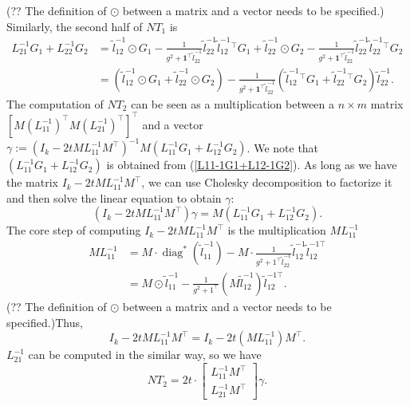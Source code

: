 \documentclass[final,onefignum,onetabnum]{siamart190516}
\begin{document}
(?? The definition of $\odot$ between a matrix and a vector needs to be specified.) Similarly, the second half of $NT_1$ is
\begin{equation}
    \begin{aligned}
            L^{-1}_{21} G_1 + L^{-1}_{22} G_2 &= \widetilde{l}^{-1}_{12} \odot G_1 - \frac{1}{g^2+\mathbf{1}^\top \widetilde{l}^{-1}_{22}}\widetilde{l}^{-1}_{22}\widetilde{l}^{-1}_{12}^\top G_1 + 
            \widetilde{l}^{-1}_{22} \odot G_2 - \frac{1}{g^2+\mathbf{1}^\top \widetilde{l}^{-1}_{22}}\widetilde{l}^{-1}_{22}\widetilde{l}^{-1}_{22}^\top G_2\\
            & = \left(\widetilde{l}^{-1}_{12} \odot G_1 +\widetilde{l}^{-1}_{22} \odot G_2 \right) - \frac{1}{g^2+\mathbf{1}^\top \widetilde{l}^{-1}_{22}}\left(\widetilde{l}^{-1}_{12}^\top G_1 + \widetilde{l}^{-1}_{22}^\top G_2\right)\widetilde{l}^{-1}_{22}.
    \end{aligned}
\end{equation}
The computation of $NT_2$ can be seen as a multiplication between a $n\times m$ matrix $[M(L_{11}^{-1})^{\top} M(L_{21}^{-1})^{\top}]^{\top}$ and a vector $\gamma := \left(I_k-2t M L^{-1}_{11} M^\top\right)^{-1}M\left(L^{-1}_{11} G_1 + L^{-1}_{12} G_2\right)$. We note that $\left(L^{-1}_{11} G_1 + L^{-1}_{12} G_2\right)$ is obtained from (\ref{L11-1G1+L12-1G2}). As long as we have the matrix $I_k-2t M L^{-1}_{11} M^\top$, we can use Cholesky decomposition to factorize it and then solve the linear equation to obtain $\gamma$:
\begin{equation}
    \left(I_k-2t M L^{-1}_{11} M^\top\right)\gamma = M\left(L^{-1}_{11} G_1 + L^{-1}_{12} G_2\right).
\end{equation}
The core step of computing $I_k-2t M L^{-1}_{11} M^\top$ is the multiplication $M L^{-1}_{11}$
\begin{equation}
    \begin{aligned}
             M L^{-1}_{11} &= M\cdot \operatorname{diag}^{*}\left(\widetilde{l}_{11}^{-1}\right)-M\cdot\frac{1}{g^{2}+1^{\top} \widetilde{l}_{22}^{-1}} \widetilde{l}_{12}^{-1} \widetilde{l}_{12}^{-1 \top}   \\
    &= M\odot \widetilde{l}_{11}^{-1} - \frac{1}{g^{2}+1^{\top}} \left(M\widetilde{l}_{12}^{-1}\right)\widetilde{l}_{12}^{-1 \top}.
    \end{aligned}
\end{equation}
(?? The definition of $\odot$ between a matrix and a vector needs to be specified.)Thus,
\begin{equation}
 I_k-2t M L^{-1}_{11} M^\top = I_k-2t \left(M L^{-1}_{11}\right) M^\top.  \end{equation}
 $L_{21}^{-1}$ can be computed in the similar way, so we have
 \begin{equation}
      NT_2 = 2t\cdot \begin{bmatrix} L^{-1}_{11}M^\top\\L^{-1}_{21}M^\top  \end{bmatrix} \gamma.
 \end{equation}
 
\end{document}
